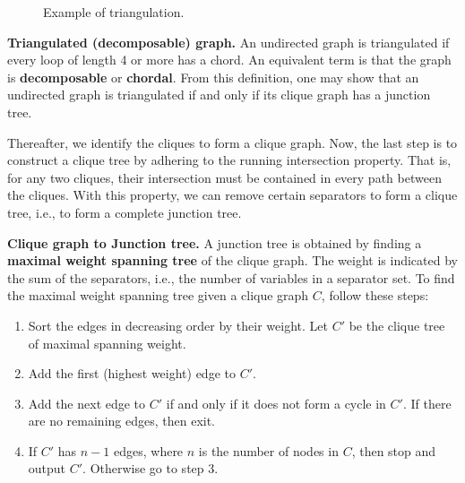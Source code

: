 \documentclass{article}
\begin{document}
\begin{figure}[H]
    \centering
    \caption{Example of triangulation.}
    \label{fig:triang}
\end{figure}

\begin{theorem}
    \textbf{Triangulated (decomposable) graph.} An undirected graph is triangulated if every loop of length 4 or more has a chord. An equivalent term is that the graph is \textbf{decomposable} or \textbf{chordal}. From this definition, one may show that an undirected graph is triangulated if and only if its clique graph has a junction tree.  
\end{theorem}

\noindent Thereafter, we identify the cliques to form a clique graph. Now, the last step is to construct a clique tree by adhering to the running intersection property. That is, for any two cliques, their intersection must be contained in every path between the cliques. With this property, we can remove certain separators to form a clique tree, i.e., to form a complete junction tree. 
\\
\begin{theorem}
    \textbf{Clique graph to Junction tree.} A junction tree is obtained by finding a \textbf{maximal weight spanning tree} of the clique graph. The weight is indicated by the sum of the separators, i.e., the number of variables in a separator set. To find the maximal weight spanning tree given a clique graph $C$, follow these steps:
    \begin{enumerate}
        \item Sort the edges in decreasing order by their weight. Let $C'$ be the clique tree of maximal spanning weight.
        \item Add the first (highest weight) edge to $C'$.
        \item Add the next edge to $C'$ if and only if it does not form a cycle in $C'$. If there are no remaining edges, then exit.
        \item If $C'$ has $n-1$ edges, where $n$ is the number of nodes in $C$, then stop and output $C'$. Otherwise go to step 3. 
    \end{enumerate}
\end{theorem}
\end{document}
